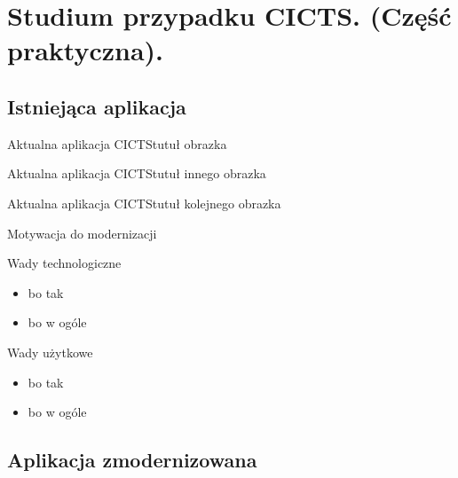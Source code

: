 \section[Studium przypadku CICTS]{Studium przypadku CICTS. (Część praktyczna).}

\subsection{Istniejąca aplikacja}

\begin{frame}{Aktualna aplikacja CICTS}{tutuł obrazka}
\end{frame}

\begin{frame}{Aktualna aplikacja CICTS}{tutuł innego obrazka}
\end{frame}

\begin{frame}{Aktualna aplikacja CICTS}{tutuł kolejnego obrazka}
\end{frame}

\begin{frame}{Motywacja do modernizacji}
    \begin{block}{Wady technologiczne}
        \begin{itemize}
        \item bo tak
        \item bo w ogóle
        \end{itemize}
    \end{block}

    \begin{block}{Wady użytkowe}
        \begin{itemize}
        \item bo tak
        \item bo w ogóle
        \end{itemize}
    \end{block}
\end{frame}

\subsection{Aplikacja zmodernizowana}

